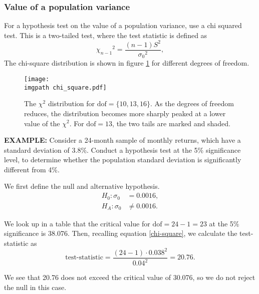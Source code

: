 \documentclass[../notes_compiled.tex]{subfiles}
\begin{document}
\subsubsection{Value of a population variance}
\begin{itemize}
\item For a hypothesis test on the value of a population variance, use a chi squared test. This is a two-tailed test, where the test statistic is defined as 
\begin{equation}
{\chi_{n-1}}^{2} = \frac{(n-1)S^{2}}{{\sigma_{0}}^{2}}, \label{chi-square}
\end{equation}
The chi-square distribution is shown in figure \ref{fig-chi-square} for different degrees of freedom.

\begin{figure}[h]
  \centering
  \texttt{[image: \\imgpath chi\_square.pdf]}
  \caption{The $\chi^{2}$ distribution for $\mathrm{dof} = \{10,13,16\}$. As the degrees of freedom reduces, the distribution becomes more sharply peaked at a lower value of the $\chi^{2}$. For $\mathrm{dof}=13$, the two tails are marked and shaded.}
  \label{fig-chi-square}
\end{figure}


{\color{RedViolet}
\item[] \textbf{EXAMPLE:} Consider a 24-month sample of monthly returns, which have a standard deviation of $3.8\%$.  Conduct a hypothesis test at the 5\% significance level, to determine whether the population standard deviation is significantly different from 4\%.
}

{\color{RoyalBlue}
\item[] We first define the null and alternative hypothesis.
\begin{align*}
H_{0}: \sigma_{0}&=0.0016, \\
H_{A}: \sigma_{0}&\neq0.0016.
\end{align*}

We look up in a table that the critical value for $\mathrm{dof}=24-1=23$ at the 5\% significance is 38.076. Then, recalling equation \ref{chi-square}, we calculate the test-statistic as
\begin{equation*}
\text{test-statistic}=\frac{(24-1)\cdot0.038^{2}}{0.04^{2}}=20.76.
\end{equation*}

We see that 20.76 does not exceed the critical value of 30.076, so we do not reject the null in this case.

}
 
\end{itemize}
\end{document}

